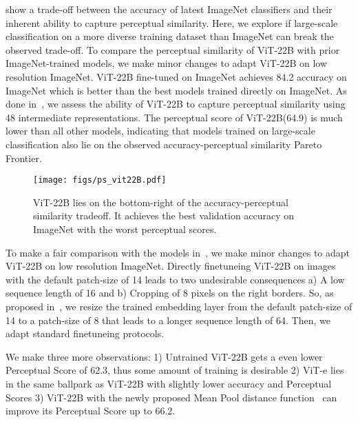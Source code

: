 \documentclass{article}
\newcommand{\chonk}{\mbox{ViT-22B}\xspace}
\begin{document}
\citet{kumar2022do} show a trade-off between the accuracy of latest ImageNet classifiers and their inherent ability to capture perceptual similarity. Here, we explore if large-scale classification on a more diverse training dataset than ImageNet can break the observed trade-off. To compare the perceptual similarity of \chonk with prior ImageNet-trained models, we make minor changes to adapt \chonk on low resolution  ImageNet. \chonk fine-tuned on ImageNet  achieves 84.2 accuracy on ImageNet  which is  better than the best models trained directly on ImageNet. As done in~\citep{zhang2018perceptual}, we assess the ability of \chonk to capture perceptual similarity using 48 intermediate representations. The perceptual score of \chonk (64.9) is much lower than all other models, indicating that models trained on large-scale classification also lie on the observed accuracy-perceptual similarity Pareto Frontier.

\begin{figure}[htbp]
    \centering
    \texttt{[image: figs/ps\_vit22B.pdf]}
    \caption{\chonk lies on the bottom-right of the accuracy-perceptual similarity tradeoff. It achieves the best validation accuracy on  ImageNet with the worst perceptual scores.}
    \label{fig:ps_vit22B}
\end{figure}

To make a fair comparison with the models in~\citep{kumar2022do}, we make minor changes to adapt ViT-22B on low resolution  ImageNet. Directly finetuneing ViT-22B on  images with the default patch-size of 14 leads to two undesirable consequences a) A low sequence length of 16 and b) Cropping of 8 pixels on the right borders. So, as proposed in~\citep{beyer2022flexivit}, we resize the trained embedding layer from the default patch-size of 14 to a patch-size of 8 that leads to a longer sequence length of 64. Then, we adapt standard finetuneing protocols.

We make three more observations: 1) Untrained ViT-22B gets a even lower Perceptual Score of 62.3, thus some amount of training is desirable 2) ViT-e lies in the same ballpark as ViT-22B with slightly lower accuracy and Perceptual Scores 3) ViT-22B with the newly proposed Mean Pool distance function~\citep{kumar2022do} can improve its Perceptual Score up to 66.2.
\end{document}
